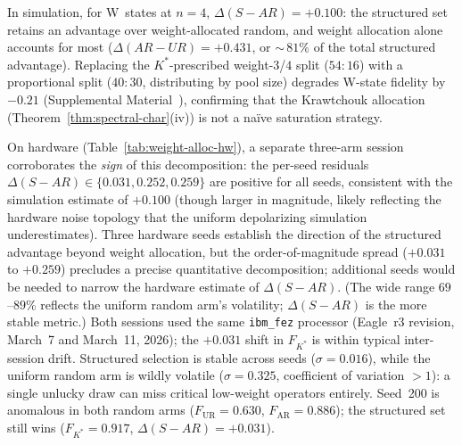 \documentclass[twocolumn,prx,aps,superscriptaddress,longbibliography,floatfix]{revtex4-2}
\begin{document}
In simulation, for W~states at $n = 4$, $\Delta(S{-}AR) = +0.100$: the
structured set retains an advantage over weight-allocated random,
and weight allocation alone accounts for most
($\Delta(AR{-}UR) = +0.431$, or ${\sim}\,81$\% of the
total structured advantage).
Replacing the $K^*$-prescribed weight-$3$/$4$ split ($54{:}16$)
with a proportional split ($40{:}30$, distributing by pool size)
degrades W-state fidelity by $-0.21$ (Supplemental Material~\cite{supplemental}),
confirming that the Krawtchouk allocation
(Theorem~\ref{thm:spectral-char}(iv)) is not a
na\"ive saturation strategy.

On hardware (Table~\ref{tab:weight-alloc-hw}),
a separate three-arm session
corroborates the \emph{sign} of this decomposition: the per-seed residuals
$\Delta(S{-}AR) \in \{0.031, 0.252, 0.259\}$ are positive for all
seeds, consistent with the simulation estimate of
$+0.100$ (though larger in magnitude, likely reflecting the
hardware noise topology that the uniform depolarizing simulation
underestimates).  Three hardware seeds establish the direction of the
structured advantage beyond weight allocation, but the order-of-magnitude
spread ($+0.031$ to $+0.259$) precludes a precise quantitative
decomposition; additional seeds would be needed to narrow the hardware
estimate of $\Delta(S{-}AR)$.  (The wide range $69$--$89$\% reflects the uniform random arm's
volatility; $\Delta(S{-}AR)$ is the more stable metric.)
Both sessions used the same \texttt{ibm\_fez} processor (Eagle~r3
revision, March~7 and March~11, 2026); the $+0.031$ shift in
$F_{K^*}$ is within typical inter-session drift.
Structured selection is stable across seeds ($\sigma = 0.016$),
while the uniform random arm is wildly volatile ($\sigma = 0.325$,
coefficient of variation $> 1$): a single unlucky draw can miss
critical low-weight operators entirely.
Seed~200 is anomalous in both random arms
($F_\mathrm{UR} = 0.630$, $F_\mathrm{AR} = 0.886$);
the structured set still wins ($F_{K^*} = 0.917$,
$\Delta(S{-}AR) = +0.031$).
\end{document}
